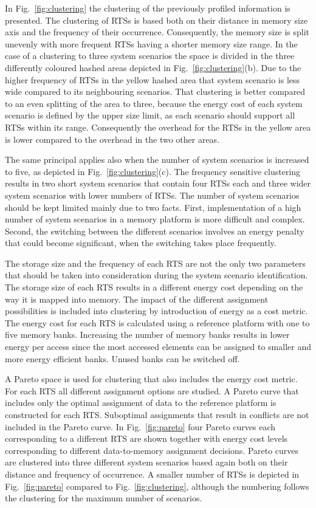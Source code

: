 \documentclass{acm_proc_article-sp}
\begin{document}
In Fig.~\ref{fig:clustering} the clustering of the previously profiled information is presented. The clustering of RTSs is based both on their distance in memory size axis and the frequency of their occurrence. Consequently, the memory size is split unevenly with more frequent RTSs having a shorter memory size range. In the case of a clustering to three system scenarios the space is divided in the three differently coloured hashed areas depicted in Fig.~\ref{fig:clustering}(b). Due to the higher frequency of RTSs in the yellow hashed area that system scenario is less wide compared to its neighbouring scenarios. That clustering is better compared to an even splitting of the area to three, because the energy cost of each system scenario is defined by the upper size limit, as each scenario should support all RTSs within its range. Consequently the overhead for the RTSs in the yellow area is lower compared to the overhead in the two other areas.

The same principal applies also when the number of system scenarios is increased to five, as depicted in Fig.~\ref{fig:clustering}(c). The frequency sensitive clustering results in two short system scenarios that contain four RTSs each and three wider system scenarios with lower numbers of RTSs. The number of system scenarios should be kept limited mainly due to two facts. First, implementation of a high number of system scenarios in a memory platform is more difficult and complex. Second, the switching between the different scenarios involves an energy penalty that could become significant, when the switching takes place frequently.

The storage size and the frequency of each RTS are not the only two parameters that should be taken into consideration during the system scenario identification. The storage size of each RTS results in a different energy cost depending on the way it is mapped into memory. The impact of the different assignment possibilities is included into clustering by introduction of energy as a cost metric. The energy cost for each RTS is calculated using a reference platform with one to five memory banks. Increasing the number of memory banks results in lower energy per access since the most accessed elements can be assigned to smaller and more energy efficient banks. Unused banks can be switched off.

A Pareto space is used for clustering that also includes the energy cost metric. For each RTS all different assignment options are studied. A Pareto curve that includes only the optimal assignment of data to the reference platform is constructed for each RTS. Suboptimal assignments that result in conflicts are not included in the Pareto curve. In Fig.~\ref{fig:pareto} four Pareto curves each corresponding to a different RTS are shown together with energy cost levels corresponding to different data-to-memory assignment decisions. Pareto curves are clustered into three different system scenarios based again both on their distance and frequency of occurrence. A smaller number of RTSs is depicted in Fig.~\ref{fig:pareto} compared to Fig.~\ref{fig:clustering}, although the numbering follows the clustering for the maximum number of scenarios. 
\end{document}
